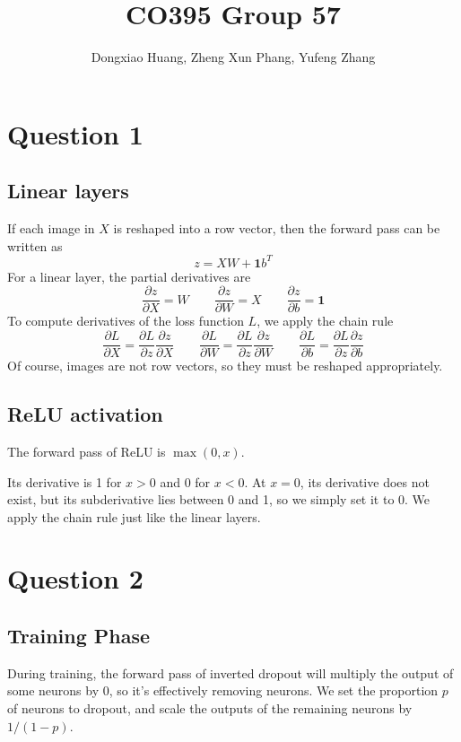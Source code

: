 \documentclass[12pt, a4paper]{article}
\title{\vspace{-6ex} CO395 Group 57 \vspace{-1ex}}
\author{Dongxiao Huang, Zheng Xun Phang, Yufeng Zhang}
\date{\vspace{-3ex}}
\begin{document}
\maketitle
\newcommand\ones{\bm{1}}

\section*{Question 1}

\subsection*{Linear layers}
If each image in $X$ is reshaped into a row vector, then the forward pass can be written as
\[ z = XW + \ones b^T \]
For a linear layer, the partial derivatives are
\[ \frac{\partial z}{\partial X} = W \qquad \frac{\partial z}{\partial W} = X \qquad \frac{\partial z}{\partial b} = \ones \]
To compute derivatives of the loss function $L$, we apply the chain rule
\[ \frac{\partial L}{\partial X} = \frac{\partial L}{\partial z} \frac{\partial z}{\partial X} \qquad \frac{\partial L}{\partial W} = \frac{\partial L}{\partial z} \frac{\partial z}{\partial W} \qquad \frac{\partial L}{\partial b} = \frac{\partial L}{\partial z} \frac{\partial z}{\partial b} \]
Of course, images are not row vectors, so they must be reshaped appropriately.

\subsection*{ReLU activation}
The forward pass of ReLU is $\max(0, x)$.\par
\bigskip
Its derivative is 1 for $x > 0$ and 0 for $x < 0$. At $x = 0$, its derivative does not exist, but its subderivative  lies between 0 and 1, so we simply set it to 0. We apply the chain rule just like the linear layers.

\section*{Question 2}

\subsection*{Training Phase}
During training, the forward pass of inverted dropout will multiply the output of some neurons by 0, so it's effectively removing neurons. We set the proportion $p$ of neurons to dropout, and scale the outputs of the remaining neurons by $1/(1-p)$.
\end{document}
